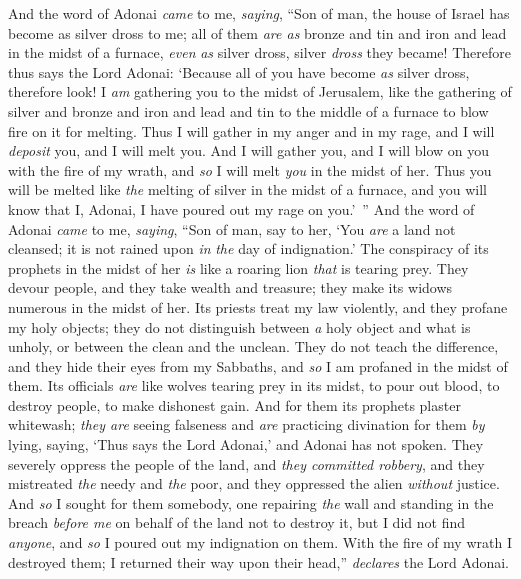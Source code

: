 \begin{biblechapter}
\verse And the word of Adonai \textit{came} to me, \textit{saying},
\verse “Son of man, the house of Israel has become as silver dross to me; all of them \textit{are as} bronze and tin and iron and lead in the midst of a furnace, \textit{even} \textit{as} silver dross, silver \textit{dross} they became!
\verse Therefore thus says the Lord Adonai: ‘Because all of you have become \textit{as} silver dross, therefore look! I \textit{am} gathering you to the midst of Jerusalem,
\verse like the gathering of silver and bronze and iron and lead and tin to the middle of a furnace to blow fire on it for melting. Thus I will gather in my anger and in my rage, and I will \textit{deposit} you, and I will melt you.
\verse And I will gather you, and I will blow on you with the fire of my wrath, and \textit{so} I will melt \textit{you} in the midst of her.
\verse Thus you will be melted like \textit{the} melting of silver in the midst of a furnace, and you will know that I, Adonai, I have poured out my rage on you.’ ”
\verse And the word of Adonai \textit{came} to me, \textit{saying},
\verse “Son of man, say to her, ‘You \textit{are} a land not cleansed; it is not rained upon \textit{in} \textit{the} day of indignation.’
\verse The conspiracy of its prophets in the midst of her \textit{is} like a roaring lion \textit{that} is tearing prey. They devour people, and they take wealth and treasure; they make its widows numerous in the midst of her.
\verse Its priests treat my law violently, and they profane my holy objects; they do not distinguish between \textit{a} holy object and what is unholy, or between the clean and the unclean. They do not teach the difference, and they hide their eyes from my Sabbaths, and \textit{so} I am profaned in the midst of them.
\verse Its officials \textit{are} like wolves tearing prey in its midst, to pour out blood, to destroy people, to make dishonest gain.
\verse And for them its prophets plaster whitewash; \textit{they are} seeing falseness and \textit{are} practicing divination for them \textit{by} lying, saying, ‘Thus says the Lord Adonai,’ and Adonai has not spoken.
\verse They severely oppress the people of the land, and \textit{they committed robbery}, and they mistreated \textit{the} needy and \textit{the} poor, and they oppressed the alien \textit{without} justice.
\verse And \textit{so} I sought for them somebody, one repairing \textit{the} wall and standing in the breach \textit{before me} on behalf of the land not to destroy it, but I did not find \textit{anyone},
\verse and \textit{so} I poured out my indignation on them. With the fire of my wrath I destroyed them; I returned their way upon their head,” \textit{declares} the Lord Adonai.
\end{biblechapter}

